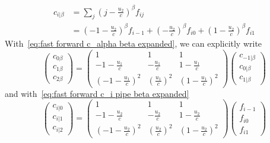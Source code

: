 \documentclass{article}
\begin{document}
\begin{equation}
  \begin{aligned}
    \label{eq:fast forward c_i pipe beta expanded}
    c_{i|\beta} & = \sum_{j} {\left(j-\frac{u_2}{c}\right)}^\beta f_{ij} \\
    & = {\left(-1-\frac{u_2}{c}\right)}^\beta f_{i-1} + {\left(-\frac{u_2}{c}\right)}^\beta f_{i0} + {\left(1-\frac{u_2}{c}\right)}^\beta f_{i1}
  \end{aligned}
\end{equation}
With~\eqref{eq:fast forward c_alpha beta expanded}, we can explicitly write
\begin{equation}
  \label{eq:fast forward c_alpha beta matrix}
  \begin{pmatrix}
    c_{0\beta} \\
    c_{1\beta} \\
    c_{2\beta}
  \end{pmatrix}
  =
  \begin{pmatrix}
    1 & 1 & 1 \\
    -1-\frac{u_1}{c} & - \frac{u_1}{c} &   1-\frac{u_1}{c} \\
    {\left(-1-\frac{u_1}{c}\right)}^2 & {\left(\frac{u_1}{c}\right)}^2 &  {\left(1-\frac{u_1}{c}\right)}^2
  \end{pmatrix}
  \begin{pmatrix}
    c_{-1|\beta} \\
    c_{0|\beta} \\
    c_{1|\beta}
  \end{pmatrix}
\end{equation}
and with~\eqref{eq:fast forward c_i pipe beta expanded}
\begin{equation}
  \label{eq:fast forward c_i pipe beta matrix}
  \begin{pmatrix}
    c_{i|0} \\
    c_{i|1} \\
    c_{i|2}
  \end{pmatrix}
  =
  \begin{pmatrix}
    1 & 1 & 1 \\
    -1-\frac{u_2}{c} & - \frac{u_2}{c} &   1-\frac{u_2}{c} \\
    {\left(-1-\frac{u_2}{c}\right)}^2 & {\left(\frac{u_2}{c}\right)}^2 &  {\left(1-\frac{u_2}{c}\right)}^2
  \end{pmatrix}
  \begin{pmatrix}
    f_{i-1} \\
    f_{i0} \\
    f_{i1}
  \end{pmatrix}
\end{equation}
\end{document}

